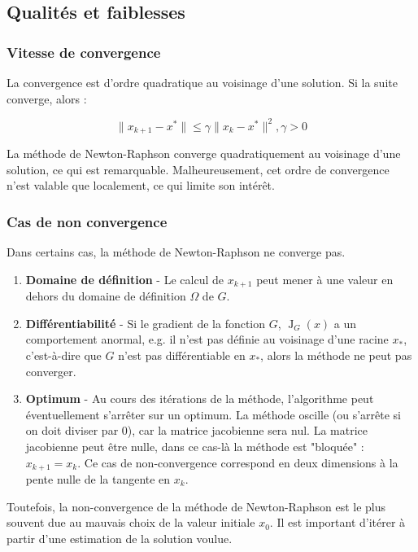 \documentclass[3p, twocolumn]{elsarticle}
\DeclareMathOperator{\Jacobian}{J}
\begin{document}
\subsection{Qualités et faiblesses}
\subsubsection{Vitesse de convergence}
La convergence est d'ordre quadratique au voisinage d'une solution. Si la suite converge, alors :

\begin{equation*}
    \lVert x_{k+1}-x^{*}\rVert \leq \gamma\lVert x_{k}- x^{*}\rVert^{2}, \gamma >0
    \label{eq:convergence-nr}
\end{equation*}

La méthode de Newton-Raphson converge quadratiquement au voisinage d'une solution, ce qui est remarquable. Malheureusement, cet ordre de convergence n'est valable que localement, ce qui limite son intérêt.

\subsubsection{Cas de non convergence}
Dans certains cas, la méthode de Newton-Raphson ne converge pas.

\begin{enumerate}
    \item \textbf{Domaine de définition} - Le calcul de $x_{k+1}$ peut mener à une valeur en dehors du domaine de définition $\Omega$ de $G$.

    \item \textbf{Différentiabilité} - Si le gradient de la fonction $G$, $\Jacobian_G(x)$ a un comportement anormal, e.g. il n'est pas définie au voisinage d'une racine $x_*$, c'est-à-dire que $G$ n'est pas différentiable en $x_*$, alors la méthode ne peut pas converger.

    \item \textbf{Optimum} - Au cours des itérations de la méthode, l'algorithme peut éventuellement s'arrêter sur un optimum. La méthode oscille (ou s'arrête si on doit diviser par 0), car la matrice jacobienne sera nul. La matrice jacobienne peut être nulle, dans ce cas-là la méthode est "bloquée" : $x_{k+1} = x_k$. Ce cas de non-convergence correspond en deux dimensions à la pente nulle de la tangente en $x_k$.

\end{enumerate}

Toutefois, la non-convergence de la méthode de Newton-Raphson est le plus souvent due au mauvais choix de la valeur initiale $x_{0}$. Il est important d'itérer à partir d'une estimation de la solution voulue.
\end{document}

